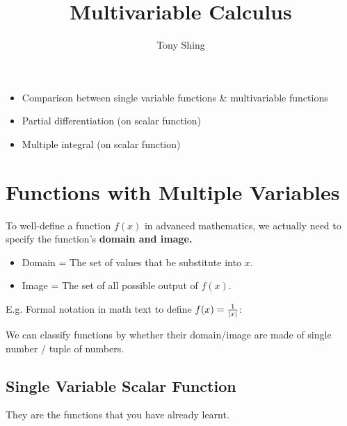 \documentclass[class=article, crop=false, 12pt]{standalone}
\author{Tony Shing}
\title{Multivariable Calculus}
\begin{document}
\maketitle

\begin{overview}
    \begin{itemize}
        \item Comparison between single variable functions \& multivariable functions
        \item Partial differentiation (on scalar function)
        \item Multiple integral (on scalar function)
    \end{itemize}
\end{overview}



\section{Functions with Multiple Variables}

To well-define a function $f(x)$ in advanced mathematics,
we actually need to specify the function's \bf{domain} and \bf{image}.\\

\begin{itemize}
    \item Domain = The set of values that be substitute into $x$.
    \item Image = The set of all possible output of $f(x)$. 
\end{itemize}

E.g. Formal notation in math text to define $f(x) = \frac{1}{|x|}$:

We can classify functions by whether their domain/image are made of single number / tuple of numbers.



\subsection{Single Variable Scalar Function}

They are the functions that you have already learnt.
\end{document}
